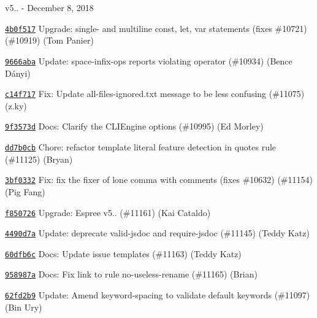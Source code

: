 v5.. -\/ December 8, 2018


\begin{DoxyItemize}
\item \href{https://github.com/eslint/eslint/commit/4b0f517cd317e5f1b99a1e8a0392332bd8a2e231}{\texttt{ {\ttfamily 4b0f517}}} Upgrade\+: single-\/ and multiline const, let, var statements (fixes \#10721) (\#10919) (Tom Panier)
\item \href{https://github.com/eslint/eslint/commit/9666abaf46c841fba7b5d4e53c6998cd25b9bc33}{\texttt{ {\ttfamily 9666aba}}} Update\+: space-\/infix-\/ops reports violating operator (\#10934) (Bence Dányi)
\item \href{https://github.com/eslint/eslint/commit/c14f717f4c32860766185da47f64f8eb0c2d2998}{\texttt{ {\ttfamily c14f717}}} Fix\+: Update all-\/files-\/ignored.\+txt message to be less confusing (\#11075) (z.\+ky)
\item \href{https://github.com/eslint/eslint/commit/9f3573dda3dc35bc220e945686cc835eaad0ac2c}{\texttt{ {\ttfamily 9f3573d}}} Docs\+: Clarify the CLIEngine options (\#10995) (Ed Morley)
\item \href{https://github.com/eslint/eslint/commit/dd7b0cb019d94964930d30fec36f7b22ef072822}{\texttt{ {\ttfamily dd7b0cb}}} Chore\+: refactor template literal feature detection in \textquotesingle{}quotes\textquotesingle{} rule (\#11125) (Bryan)
\item \href{https://github.com/eslint/eslint/commit/3bf0332508b921cb660c2e8a1ab7ddf46a2013b6}{\texttt{ {\ttfamily 3bf0332}}} Fix\+: fix the fixer of lone comma with comments (fixes \#10632) (\#11154) (Pig Fang)
\item \href{https://github.com/eslint/eslint/commit/f8507260c2091d18488fde20e466639d1a7f913c}{\texttt{ {\ttfamily f850726}}} Upgrade\+: Espree v5.. (\#11161) (Kai Cataldo)
\item \href{https://github.com/eslint/eslint/commit/4490d7af529d4ecc18b6874f1d838869656da58a}{\texttt{ {\ttfamily 4490d7a}}} Update\+: deprecate valid-\/jsdoc and require-\/jsdoc (\#11145) (Teddy Katz)
\item \href{https://github.com/eslint/eslint/commit/60dfb6c623dfe829e5350dabe507e7850c1beacf}{\texttt{ {\ttfamily 60dfb6c}}} Docs\+: Update issue templates (\#11163) (Teddy Katz)
\item \href{https://github.com/eslint/eslint/commit/958987aa6f5630faa051d8f822f0200faff41924}{\texttt{ {\ttfamily 958987a}}} Docs\+: Fix link to rule no-\/useless-\/rename (\#11165) (Brian)
\item \href{https://github.com/eslint/eslint/commit/62fd2b93448966331db3eb2dfbe4e1273eb032b2}{\texttt{ {\ttfamily 62fd2b9}}} Update\+: Amend keyword-\/spacing to validate {\ttfamily default} keywords (\#11097) (Bin Ury)

\end{DoxyItemize}
